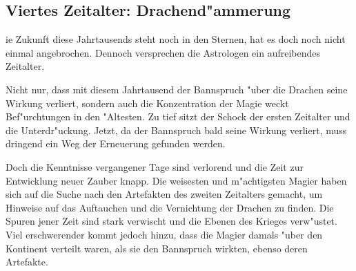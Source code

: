 \subsection{Viertes Zeitalter: Drachend"ammerung}
ie Zukunft diese Jahrtausends
steht noch in den Sternen, hat es doch noch nicht einmal
angebrochen. Dennoch versprechen die Astrologen ein aufreibendes
Zeitalter.
\par Nicht nur, dass mit diesem Jahrtausend
der Bannspruch "uber die
Drachen seine Wirkung verliert, sondern auch die
Konzentration der Magie weckt Bef"urchtungen in den "Altesten. Zu
tief sitzt der Schock der ersten Zeitalter und
die Unterdr"uckung. Jetzt, da der Bannspruch
bald seine Wirkung verliert, muss dringend ein Weg der Erneuerung
gefunden werden.
\par Doch die Kenntnisse vergangener Tage sind verlorend und die
Zeit zur Entwicklung neuer Zauber knapp. Die weisesten und
m"achtigsten Magier haben sich auf die Suche nach den Artefakten des
zweiten Zeitalters gemacht, um Hinweise auf das Auftauchen und die
Vernichtung der Drachen zu finden. Die Spuren jener Zeit sind stark
verwischt und die Ebenen des Krieges verw"ustet. Viel erschwerender
kommt jedoch hinzu, dass die Magier damals "uber den Kontinent
verteilt waren, als sie den Bannspruch wirkten, ebenso deren
Artefakte.
